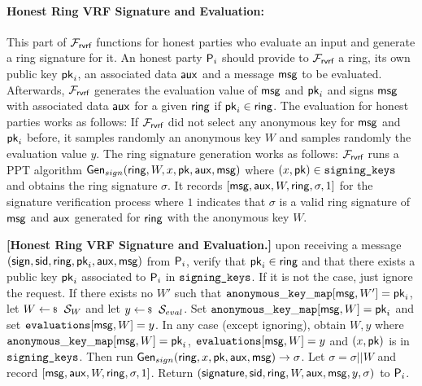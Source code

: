 \paragraph{Honest Ring VRF Signature and Evaluation:} This part of $ \mathcal{F}_{\textsf{rvrf}} $ functions for honest parties who evaluate an input and generate a ring signature for it. An honest party $ \mathsf{P}_i $ should provide to $ \mathcal{F}_{\textsf{rvrf}} $ a ring, its own public key $ \mathsf{pk}_i $,  an associated data $ \mathsf{aux} $ and a message $ \mathsf{msg} $ to be  evaluated. Afterwards, $ \mathcal{F}_{\textsf{rvrf}} $ generates the evaluation value of $ \mathsf{msg} $ and $ \mathsf{pk}_i $ and signs $ \mathsf{msg} $ with associated data $ \mathsf{aux} $ for a given $ \mathsf{ring} $ if $ \mathsf{pk}_i \in \mathsf{ring} $. The evaluation for honest parties works as follows: If $ \mathcal{F}_{\textsf{rvrf}} $ did not select any anonymous key for $ \mathsf{msg} $ and $ \mathsf{pk}_i $ before, it samples randomly an anonymous key $ W $ and samples randomly the evaluation value $ y $. The ring signature generation works as follows:  $ \mathcal{F}_{\textsf{rvrf}} $ runs a PPT algorithm $ \mathsf{Gen}_{sign}(\mathsf{ring}, W, x,\mathsf{pk},\mathsf{aux},\mathsf{msg}) $ where $ (x,\mathsf{pk}) \in \texttt{signing\_keys} $ and obtains the ring signature $ \sigma $. It records $  [\mathsf{msg},\mathsf{aux}, W, \mathsf{ring},\sigma, 1]  $ for the signature verification process where $ 1 $ indicates that $ \sigma  $ is a valid ring signature of $ \mathsf{msg} $ and $ \mathsf{aux} $ generated for $ \mathsf{ring} $ with the anonymous key $ W $.

\begin{tcolorbox}[left=2pt,right=2pt]
	\eprint{}{\scriptsize}
	\textbf{[Honest Ring VRF Signature and Evaluation.]} upon receiving a message $(\mathsf{sign}, \textsf{sid}, \mathsf{ring}, \mathsf{pk}_i,\mathsf{aux}, \mathsf{msg})$ from $\mathsf{P}_i$, verify that $\mathsf{pk}_i \in \mathsf{ring}$ and that there exists a public key $\mathsf{pk}_i$ associated to $\mathsf{P}_i$ in $ \texttt{signing\_keys} $. If it is not the case, just ignore the request. 	
	If there exists no $ W' $ such that $ \mathtt{anonymous\_key\_map}[\mathsf{msg},W'] =  \mathsf{pk}_i $, let $ W \leftsample \setsym{S}_W $ and let $y \leftsample \setsym{S}_{eval}$. Set $ \mathtt{anonymous\_key\_map}[\mathsf{msg},W] = \mathsf{pk}_i $ and set $ \texttt{evaluations}[\mathsf{msg}, W] = y$.
	In any case (except ignoring), obtain $ W, y $ where $ \mathtt{anonymous\_key\_map}[\mathsf{msg},W] =\mathsf{pk}_i $, $ \texttt{evaluations}[\mathsf{msg}, W] = y$ and  $ (x, \mathsf{pk}) $ is in $\texttt{signing\_keys} $. Then run  $ \mathsf{Gen}_{sign}(\mathsf{ring},x,\mathsf{pk},\mathsf{aux},\mathsf{msg}) \rightarrow \sigma $.
	Let $ \sigma = \sigma||W $ and record $ [\mathsf{msg},\mathsf{aux}, W, \mathsf{ring},\sigma, 1] $. Return $(\mathsf{signature}, \textsf{sid}, \mathsf{ring},W,\mathsf{aux},\mathsf{msg}, y, \sigma)$ to $\mathsf{P}_i$.
\end{tcolorbox}






